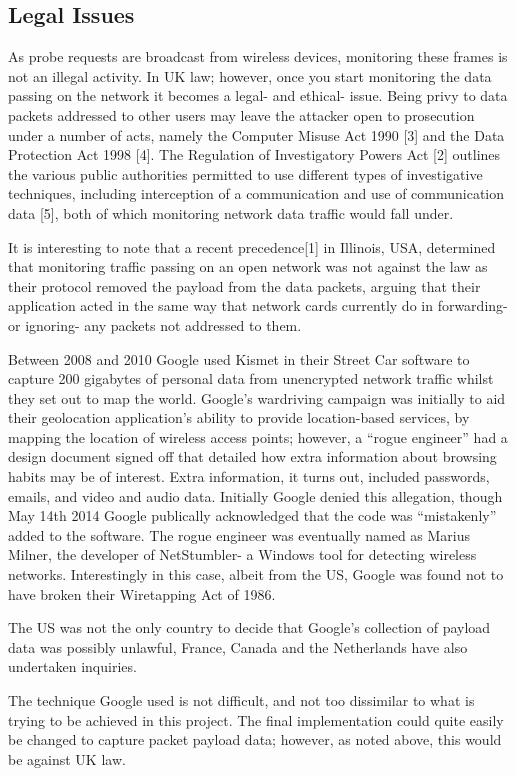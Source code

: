 \subsection{Legal Issues}
As probe requests are broadcast from wireless devices, monitoring these frames is not an illegal activity. In UK law; however, once you start monitoring the data passing on the network it becomes a legal- and ethical- issue. Being privy to data packets addressed to other users may leave the attacker open to prosecution under a number of acts, namely the Computer Misuse Act 1990 [3] and the Data Protection Act 1998 [4]. The Regulation of Investigatory Powers Act [2] outlines the various public authorities permitted to use different types of investigative techniques, including interception of a communication and use of communication data [5], both of which monitoring network data traffic would fall under.

It is interesting to note that a recent precedence[1] in Illinois, USA, determined that monitoring traffic passing on an open network was not against the law as their protocol removed the payload from the data packets, arguing that their application acted in the same way that network cards currently do in forwarding- or ignoring- any packets not addressed to them. 

Between 2008 and 2010 Google used Kismet in their Street Car software to capture 200 gigabytes of personal data from unencrypted network traffic whilst they set out to map the world. Google's wardriving campaign was initially to aid their geolocation application's ability to provide location-based services, by mapping the location of wireless access points; however, a ``rogue engineer'' had a design document signed off that detailed how extra information about browsing habits may be of interest. Extra information, it turns out, included passwords, emails, and video and audio data. Initially Google denied this allegation, though May 14th 2014 Google publically acknowledged that the code was ``mistakenly'' added to the software. The rogue engineer was eventually named as Marius Milner, the developer of NetStumbler- a Windows tool for detecting wireless networks. Interestingly in this case, albeit from the US, Google was found not to have broken their Wiretapping Act of 1986.

The US was not the only country to decide that Google's collection of payload data was possibly unlawful, France, Canada and the Netherlands have also undertaken inquiries.

The technique Google used is not difficult, and not too dissimilar to what is trying to be achieved in this project. The final implementation could quite easily be changed to capture packet payload data; however, as noted above, this would be against UK law.